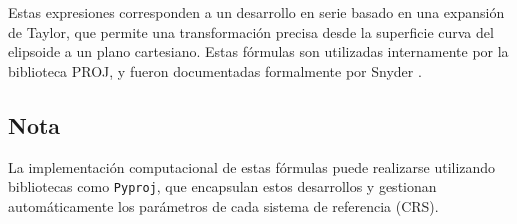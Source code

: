 \documentclass[12pt]{article}
\begin{document}
Estas expresiones corresponden a un desarrollo en serie basado en una expansión de Taylor, que permite una transformación precisa desde la superficie curva del elipsoide a un plano cartesiano. Estas fórmulas son utilizadas internamente por la biblioteca PROJ, y fueron documentadas formalmente por Snyder \citep{snyder_tm}.

\subsection*{Nota}

La implementación computacional de estas fórmulas puede realizarse utilizando bibliotecas como \texttt{Pyproj}, que encapsulan estos desarrollos y gestionan automáticamente los parámetros de cada sistema de referencia (CRS).


\newpage



\end{document}
